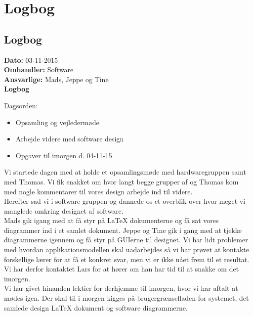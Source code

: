 \chapter{Logbog}
\section{Logbog}

\textbf{Dato:} 03-11-2015 \\
\textbf{Omhandler:} Software \\
\textbf{Ansvarlige:} Mads, Jeppe og Tine \\
\textbf{Logbog}

Dagsorden:
\begin{itemize}
	\item Opsamling og vejledermøde
	\item Arbejde videre med software design
	\item Opgaver til imorgen d. 04-11-15 
\end{itemize}

Vi startede dagen med at holde et opsamlingsmøde med hardwaregruppen samt med Thomas. Vi fik snakket om hvor langt begge grupper af og Thomas kom med nogle kommentarer til vores design arbejde ind til videre.\\
Herefter sad vi i software gruppen og dannede os et overblik over hvor meget vi manglede omkring designet af software. \\
Mads gik igang med at få styr på LaTeX dokumenterne og få sat vores diagrammer ind i et samlet dokument. Jeppe og Tine gik i gang med at tjekke diagrammerne igennem og få styr på GUIerne til designet. Vi har lidt problemer med hvordan applikationsmodellen skal uadarbejdes så vi har prøvet at kontakte forskellige lærer for at få et konkret svar, men vi er ikke nået frem til et resultat. Vi har derfor kontaktet Lars for at hører om han har tid til at snakke om det imorgen.\\
Vi har givet hinanden lektier for derhjemme til imorgen, hvor vi har aftalt at mødes igen. Der skal til i morgen kigges på brugergrænsefladen for systemet, det samlede design LaTeX dokument og software diagrammerne.   
   

